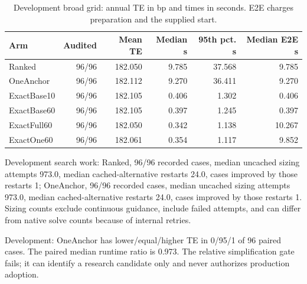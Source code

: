\begin{table}[htbp]\centering\small\setlength{\tabcolsep}{4pt}

\caption{Development broad grid: annual TE in bp and times in seconds. E2E charges preparation and the supplied start.}

\begin{tabular}{lrrrrr}\toprule

Arm & Audited & Mean TE & Median s & 95th pct. s & Median E2E s\\\midrule

Ranked & 96/96 & 182.050 & 9.785 & 37.568 & 9.785\\

OneAnchor & 96/96 & 182.112 & 9.270 & 36.411 & 9.270\\

ExactBase10 & 96/96 & 182.105 & 0.406 & 1.302 & 0.406\\

ExactBase60 & 96/96 & 182.105 & 0.397 & 1.245 & 0.397\\

ExactFull60 & 96/96 & 182.050 & 0.342 & 1.138 & 10.267\\

ExactOne60 & 96/96 & 182.061 & 0.354 & 1.117 & 9.852\\

\bottomrule\end{tabular}\end{table}

Development search work: Ranked, 96/96 recorded cases, median uncached sizing attempts 973.0, median cached-alternative restarts 24.0, cases improved by those restarts 1; OneAnchor, 96/96 recorded cases, median uncached sizing attempts 973.0, median cached-alternative restarts 24.0, cases improved by those restarts 1. Sizing counts exclude continuous guidance, include failed attempts, and can differ from native solve counts because of internal retries.

Development: OneAnchor has lower/equal/higher TE in 0/95/1 of 96 paired cases. The paired median runtime ratio is 0.973. The relative simplification gate fails; it can identify a research candidate only and never authorizes production adoption.

